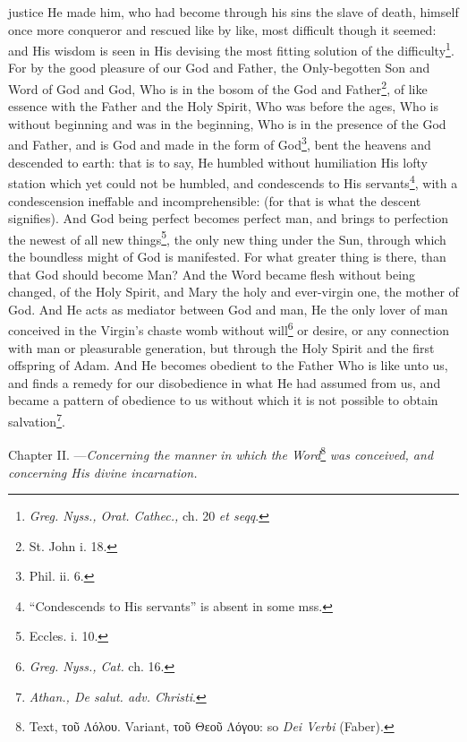 justice He made him, who had become through his sins the slave of death, himself once more conqueror and rescued like by like, most difficult though it seemed: and His wisdom is seen in His devising the most fitting solution of the difficulty\footnote{\emph{Greg. Nyss., Orat. Cathec., }ch. 20 \emph{et seqq}.}. For by the good pleasure of our God and Father, the Only-begotten Son and Word of God and God, Who is in the bosom of the God and Father\footnote{St. John i. 18.}, of like essence with the Father and the Holy Spirit, Who was before the ages, Who is without beginning and was in the beginning, Who is in the presence of the God and Father, and is God and made in the form of God\footnote{Phil. ii. 6.}, bent the heavens and descended to earth: that is to say, He humbled without humiliation His lofty station which yet could not be humbled, and condescends to His servants\footnote{“Condescends to His servants” is absent in some mss.}, with a condescension ineffable and incomprehensible: (for that is what the descent signifies). And God being perfect becomes perfect man, and brings to perfection the newest of all new things\footnote{Eccles. i. 10.}, the only new thing under the Sun, through which the boundless might of God is manifested. For what greater thing is there, than that God should become Man? And the Word became flesh without being changed, of the Holy Spirit, and Mary the holy and ever-virgin one, the mother of God. And He acts as mediator between God and man, He the only lover of man conceived in the Virgin’s chaste womb without will\footnote{\emph{Greg. Nyss., Cat. }ch. 16.} or desire, or any connection with man or pleasurable generation, but through the Holy Spirit and the first offspring of Adam. And He becomes obedient to the Father Who is like unto us, and finds a remedy for our disobedience in what He had assumed from us, and became a pattern of obedience to us without which it is not possible to obtain salvation\footnote{\emph{Athan., De salut. adv. Christi}.}.


Chapter II. —\emph{Concerning the manner in which the Word}\footnote{Text, \textgreek{τοῦ Λόλου}. Variant, \textgreek{τοῦ Θεοῦ Λόγου}: so \emph{Dei Verbi} (Faber).} \emph{was conceived, and concerning His divine incarnation.}

